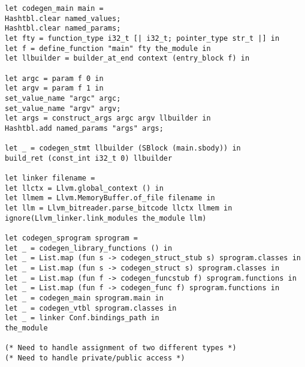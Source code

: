 \begin{verbatim}
let codegen_main main = 
Hashtbl.clear named_values;
Hashtbl.clear named_params;
let fty = function_type i32_t [| i32_t; pointer_type str_t |] in
let f = define_function "main" fty the_module in
let llbuilder = builder_at_end context (entry_block f) in

let argc = param f 0 in
let argv = param f 1 in
set_value_name "argc" argc;
set_value_name "argv" argv;
let args = construct_args argc argv llbuilder in
Hashtbl.add named_params "args" args;

let _ = codegen_stmt llbuilder (SBlock (main.sbody)) in
build_ret (const_int i32_t 0) llbuilder 

let linker filename = 
let llctx = Llvm.global_context () in
let llmem = Llvm.MemoryBuffer.of_file filename in
let llm = Llvm_bitreader.parse_bitcode llctx llmem in
ignore(Llvm_linker.link_modules the_module llm)

let codegen_sprogram sprogram = 
let _ = codegen_library_functions () in
let _ = List.map (fun s -> codegen_struct_stub s) sprogram.classes in
let _ = List.map (fun s -> codegen_struct s) sprogram.classes in
let _ = List.map (fun f -> codegen_funcstub f) sprogram.functions in
let _ = List.map (fun f -> codegen_func f) sprogram.functions in
let _ = codegen_main sprogram.main in
let _ = codegen_vtbl sprogram.classes in
let _ = linker Conf.bindings_path in
the_module

(* Need to handle assignment of two different types *)
(* Need to handle private/public access *)

\end{verbatim}	